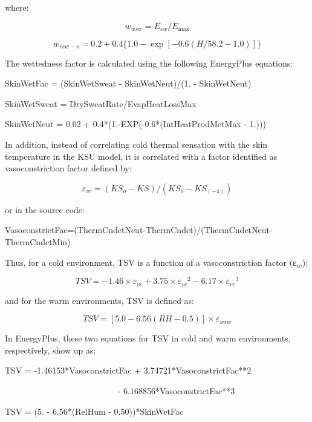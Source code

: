 where:

\begin{equation}
{w_{wsw}} = {E_{sw}}/{E_{\max }}
\end{equation}

\begin{equation}
{w_{rsw - o}} = 0.2 + 0.4\{ 1.0 - \exp [ - 0.6(H/58.2 - 1.0)]\}
\end{equation}

The wettedness factor is calculated using the following EnergyPlus equations:

SkinWetFac = (SkinWetSweat - SkinWetNeut)/(1. - SkinWetNeut)

SkinWetSweat = DrySweatRate/EvapHeatLossMax

SkinWetNeut = 0.02 + 0.4*(1.-EXP(-0.6*(IntHeatProdMetMax - 1.)))

In addition, instead of correlating cold thermal sensation with the skin temperature in the KSU model, it is correlated with a factor identified as vasoconstriction factor defined by:

\begin{equation}
{\varepsilon_{vc}} = (K{S_o} - KS)/(K{S_o} - K{S_{( - 4)}})
\end{equation}

or in the source code:

VasoconstrictFac=(ThermCndctNeut-ThermCndct)/(ThermCndctNeut-ThermCndctMin)

Thus, for a cold environment, TSV is a function of a vasoconstriction factor (ε\(_{vc}\)):

\begin{equation}
TSV =  - 1.46 \times {\varepsilon_{vc}} + 3.75 \times {\varepsilon_{vc}}^2 - 6.17 \times {\varepsilon_{vc}}^3
\end{equation}

and for the warm environments, TSV is defined as:

\begin{equation}
TSV = [5.0 - 6.56(RH - 0.5)] \times {\varepsilon_{wsw}}
\end{equation}

In EnergyPlus, these two equations for TSV in cold and warm environments, respectively, show up as:

TSV = -1.46153*VasoconstrictFac + 3.74721*VasoconstrictFac**2

~~~~~~~~~~~~~~~~~~~~~~~~~~ - 6.168856*VasoconstrictFac**3

TSV = (5. - 6.56*(RelHum - 0.50))*SkinWetFac

